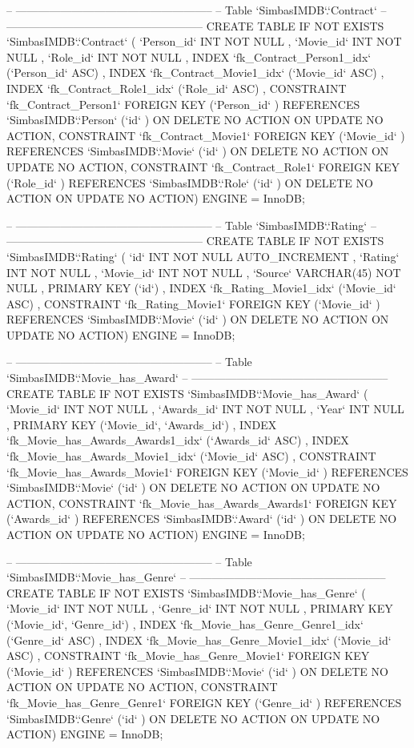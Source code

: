 \begin{spverbatim}
-- -----------------------------------------------------
-- Table `SimbasIMDB`.`Contract`
-- -----------------------------------------------------
CREATE  TABLE IF NOT EXISTS `SimbasIMDB`.`Contract` (
  `Person_id` INT NOT NULL ,
  `Movie_id` INT NOT NULL ,
  `Role_id` INT NOT NULL ,
  INDEX `fk_Contract_Person1_idx` (`Person_id` ASC) ,
  INDEX `fk_Contract_Movie1_idx` (`Movie_id` ASC) ,
  INDEX `fk_Contract_Role1_idx` (`Role_id` ASC) ,
  CONSTRAINT `fk_Contract_Person1`
    FOREIGN KEY (`Person_id` )
    REFERENCES `SimbasIMDB`.`Person` (`id` )
    ON DELETE NO ACTION
    ON UPDATE NO ACTION,
  CONSTRAINT `fk_Contract_Movie1`
    FOREIGN KEY (`Movie_id` )
    REFERENCES `SimbasIMDB`.`Movie` (`id` )
    ON DELETE NO ACTION
    ON UPDATE NO ACTION,
  CONSTRAINT `fk_Contract_Role1`
    FOREIGN KEY (`Role_id` )
    REFERENCES `SimbasIMDB`.`Role` (`id` )
    ON DELETE NO ACTION
    ON UPDATE NO ACTION)
ENGINE = InnoDB;


-- -----------------------------------------------------
-- Table `SimbasIMDB`.`Rating`
-- -----------------------------------------------------
CREATE  TABLE IF NOT EXISTS `SimbasIMDB`.`Rating` (
  `id` INT NOT NULL AUTO_INCREMENT ,
  `Rating` INT NOT NULL ,
  `Movie_id` INT NOT NULL ,
  `Source` VARCHAR(45) NOT NULL ,
  PRIMARY KEY (`id`) ,
  INDEX `fk_Rating_Movie1_idx` (`Movie_id` ASC) ,
  CONSTRAINT `fk_Rating_Movie1`
    FOREIGN KEY (`Movie_id` )
    REFERENCES `SimbasIMDB`.`Movie` (`id` )
    ON DELETE NO ACTION
    ON UPDATE NO ACTION)
ENGINE = InnoDB;


-- -----------------------------------------------------
-- Table `SimbasIMDB`.`Movie_has_Award`
-- -----------------------------------------------------
CREATE  TABLE IF NOT EXISTS `SimbasIMDB`.`Movie_has_Award` (
  `Movie_id` INT NOT NULL ,
  `Awards_id` INT NOT NULL ,
  `Year` INT NULL ,
  PRIMARY KEY (`Movie_id`, `Awards_id`) ,
  INDEX `fk_Movie_has_Awards_Awards1_idx` (`Awards_id` ASC) ,
  INDEX `fk_Movie_has_Awards_Movie1_idx` (`Movie_id` ASC) ,
  CONSTRAINT `fk_Movie_has_Awards_Movie1`
    FOREIGN KEY (`Movie_id` )
    REFERENCES `SimbasIMDB`.`Movie` (`id` )
    ON DELETE NO ACTION
    ON UPDATE NO ACTION,
  CONSTRAINT `fk_Movie_has_Awards_Awards1`
    FOREIGN KEY (`Awards_id` )
    REFERENCES `SimbasIMDB`.`Award` (`id` )
    ON DELETE NO ACTION
    ON UPDATE NO ACTION)
ENGINE = InnoDB;


-- -----------------------------------------------------
-- Table `SimbasIMDB`.`Movie_has_Genre`
-- -----------------------------------------------------
CREATE  TABLE IF NOT EXISTS `SimbasIMDB`.`Movie_has_Genre` (
  `Movie_id` INT NOT NULL ,
  `Genre_id` INT NOT NULL ,
  PRIMARY KEY (`Movie_id`, `Genre_id`) ,
  INDEX `fk_Movie_has_Genre_Genre1_idx` (`Genre_id` ASC) ,
  INDEX `fk_Movie_has_Genre_Movie1_idx` (`Movie_id` ASC) ,
  CONSTRAINT `fk_Movie_has_Genre_Movie1`
    FOREIGN KEY (`Movie_id` )
    REFERENCES `SimbasIMDB`.`Movie` (`id` )
    ON DELETE NO ACTION
    ON UPDATE NO ACTION,
  CONSTRAINT `fk_Movie_has_Genre_Genre1`
    FOREIGN KEY (`Genre_id` )
    REFERENCES `SimbasIMDB`.`Genre` (`id` )
    ON DELETE NO ACTION
    ON UPDATE NO ACTION)
ENGINE = InnoDB;



\end{spverbatim}

